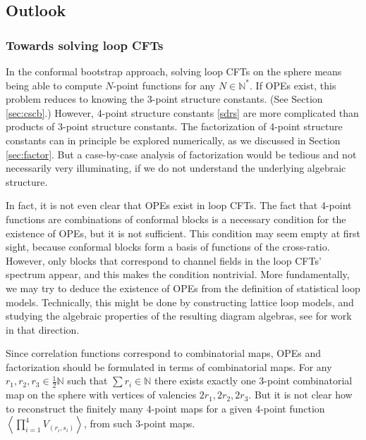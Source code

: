 \documentclass[12pt, a4paper]{article}
\begin{document}
\subsection{Outlook}

\subsubsection{Towards solving loop CFTs}

In the conformal bootstrap approach, solving loop CFTs on the sphere means being able to compute $N$-point functions for any $N\in \mathbb{N}^*$. If OPEs exist, this problem reduces to knowing the 3-point structure constants. (See Section \ref{sec:cscb}.) However, 4-point structure constants \eqref{sdrs} are more complicated than products of 3-point structure constants. The factorization of 4-point structure constants can in principle be explored numerically, as we discussed in Section \ref{sec:factor}. But a case-by-case analysis of factorization would be tedious and not necessarily very illuminating, if we do not understand the underlying algebraic structure.

In fact, it is not even clear that OPEs exist in loop CFTs. The fact that 4-point functions are combinations of conformal blocks is a necessary condition for the existence of OPEs, but it is not sufficient. This condition may seem empty at first sight, because conformal blocks form a basis of functions of the cross-ratio. However, only blocks that correspond to channel fields in the loop CFTs' spectrum appear, and this makes the condition nontrivial. More fundamentally, we may try to deduce the existence of OPEs from the definition of statistical loop models. Technically, this might be done by constructing lattice loop models, and studying the algebraic properties of the resulting diagram algebras, see \cite{im25} for work in that direction.

Since correlation functions correspond to combinatorial maps, OPEs and factorization should be formulated in terms of combinatorial maps. For any $r_1,r_2,r_3\in \frac12\mathbb{N}$ such that $\sum r_i\in\mathbb{N}$ there exists exactly one 3-point combinatorial map on the sphere with vertices of valencies $2r_1,2r_2,2r_3$. But it is not clear how to reconstruct the finitely many 4-point maps for a given 4-point function $\left<\prod_{i=1}^4 V_{(r_i,s_i)}\right>$, from such 3-point maps.
\end{document}
